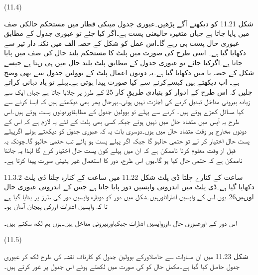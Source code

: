  
(11.4)
 
	شکل 11.21 کو دیکھتے آگے پڑھیں۔عبوری جدول میںکی قطار میں مستحکم حالکی صف میں پایا جاتا ہے جہاں متغیرہ حالیعنی پست ہے۔اگر کیا جئے تو عبوری جدول کے مطابق عبوری حال  پست ہی رہے گا۔اس عمل کو شکل کے حصہ الف میں نکتہ دار تیر سے دکھایا گیا ہے۔
	اسی طرح  کی صورت میں پلٹ کا مستحکم بلند حال  کی صف میں پایا جاتا ہے۔اگرکیا جائے تو عبوری جدول کے مطابق پلٹ بلند حال میں ہی رہتا ہے جیسے شکل کے حصہ با میں دکھایا گیا ہے۔یہ دونوں اعمال پلٹ کے بوولین جدول سے بھی وضح ہے۔
	اب دیکھتے ہیں کہسےکرنے سے کیا صورت پیدا ہوتی ہے۔پہلے تو یاد دہانی کراتے چلیں کہ اس طرح کے ادوار کو بنیادی طریقِ کار 25 کے طرز پر چلایا جاتا ہے جہاں ایک سے زیادہ بیرونی مداخل تبدیل کرنے کی اجازت نہیں ہوتی۔بہرحال پھر بھی دیکھتے ہیں کہ ایسا کرنے سے کیا مسائل کھڑے ہوتے ہیں۔
	کرنے سے پہلے تو بوولین جدول کے مطابقاوردونوں پست ہوتے ہیں۔اس طرح یہ آپس میں متضاد حال میں نہیں ہوتے جبکہ کسی بھی پلٹ کے لئے یہ لازم ہے کہ اس کے دونوں مخارج ہر وقت متضاد حال میں ہوں۔دوسری بات یہ کہ عبوری جدول کو دیکھتے ہوئے اگرپہلے پست حال اختیار کر لے تو حتمی حالہو گا جبکہ اگر پہلے پست ہو پائے تب حتمی حالہو گا۔چونکہ یہ قبل از وقت معلوم کرنا ناممکن ہے کہ ان میں پہلے کون پست حال اختیار کرے گا لہٰذا یہ جاننا ناممکن ہے کہ حتمی حال کیا ہو گا۔یوں اس طرح، دور کا استعمال غیر یقینی صورت پیدا کرتا ہے۔

11.3.2 ساعت کے کنارے چلتا ڈی پلٹ
	شکل 11.22 میں ساعت کے کنارہ چلتا ڈی پلٹ دکھایا گیا ہے۔ڈی پلٹ میں اندرونی واپسیں دور پایا جاتا ہے جس کے اندرونی عبوری حال اورہیں26۔یوں اس کے واپسیں اشاراتاورہیں۔شکل میں دور کو دوبارہ واپسیں دور کی طرز پر بنایا گیا ہے تا کہ واپسیں اشارات اورکی پہچان آسان ہو۔



	اس دور کے اورعبوری حال ،اورواپسیں اشارات  جبکہاوربیرونی مداخل ہیں۔یوں ہم لکھ سکتے ہیں۔

 
(11.5)

	شکل 11.23 میں ان مساوات سے حاصلاورکے بوولین جدول  کو کارناف نقشہ کی طرح لکھ کر عبوری جدول حاصل کیا گیا ہے۔مکمل حال کو کی صورت میں لکھتے ہوئے اس جدول پر غور کرتے ہیں۔


